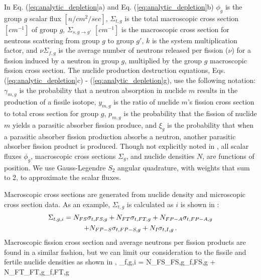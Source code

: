 In Eq. (\ref{eq:analytic_depletion}a) and Eq. (\ref{eq:analytic_depletion}b) 
$\phi_g$ is the group $g$ scalar flux $[n/cm^2/sec]$, 
$\Sigma_{t,g}$ is the total macroscopic cross section $[cm^{-1}]$ of group $g$, 
$\Sigma_{s,g \to g'}$ $[cm^{-1}]$ is the macroscopic cross section for neutrons scattering from group $g$ to group $g'$, 
$k$ is the system multiplication factor, and
$\nu \Sigma_{f,g}$ is the average number of neutrons released per fission ($\nu$) for a fission induced by a neutron in group $g$, multiplied by the group $g$ macroscopic fission cross section.
The nuclide production destruction equations, Eqs. (\ref{eq:analytic_depletion}c) - (\ref{eq:analytic_depletion}g), use the following notation:
$\gamma_{m,g}$ is the probability that a neutron absorption in nuclide $m$ results in the production of a fissile isotope, 
$y_{m,g}$ is the  ratio of nuclide $m$'s fission cross section to total cross section for group $g$,
%
$p_{m,g}$ is the probability that the fission of nuclide $m$ yields a parasitic absorber fission produce,
and $\xi_g$ is the probability that when a parasitic absorber fission production absorbs a neutron, another parasitic absorber fission product is produced.
Though not explicitly noted in , all scalar fluxes $\phi_g$, macroscopic cross sections $\Sigma_g$, and nuclide densities $N$, are functions of position.  We use Gauss-Legendre $S_2$ angular quadrature, with weights that sum to 2, to approximate the scalar fluxes.

Macroscopic cross sections are generated from nuclide density and microscopic cross section data.
As an example, $\Sigma_{t,g}$ is calculated as $i$ is shown in :
\begin{multline}
\Sigma_{t,g,i} = N_{FS}\sigma_{t,FS,g} + N_{FT}\sigma_{t,FT,g} + N_{FP-A}\sigma_{t,FP-A,g} 
\\ + N_{FP-S}\sigma_{t,FP-S,g} + N_{I}\sigma_{t,I,g} \, .
\label{eq:sigt_macro}
\end{multline}
Macroscopic fission cross section and average neutrons per fission products are found in a similar fashion, but we can limit our consideration to the fissile and fertile nuclide densities as shown in ,
\benum
\label{eq:nu_sigf_macro}
\nu\Sigma_{f,g,i} = N_{FS}\nu_{FS,g}\sigma_{f,FS,g} +  N_{FT}\nu_{FT,g}\sigma_{f,FT,g}  \pep
\eenum

